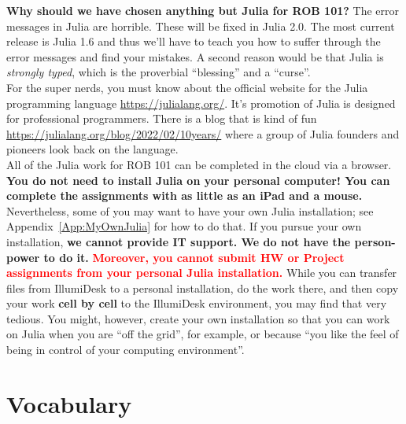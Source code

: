 \textbf{Why should we have chosen anything but Julia for ROB 101?} The error messages in Julia are horrible. These will be fixed in Julia 2.0. The most current release is Julia 1.6 and thus we'll have to teach you how to suffer through the error messages and find your mistakes. A second reason would be that Julia is \emph{strongly typed}, which is the proverbial ``blessing'' and a ``curse''. \\


For the super nerds, you must know about the official website for the Julia programming language \url{https://julialang.org/}. It's promotion of Julia is designed for professional programmers. There is a blog that is kind of fun \url{https://julialang.org/blog/2022/02/10years/} where a group of Julia founders and pioneers look back on the language. \\

All of the Julia work for ROB 101 can be completed in the cloud via a browser. \textbf{You do not need to install Julia on your personal computer! You can complete the assignments with as little as an iPad and a mouse.} Nevertheless, some of you may want to have your own Julia installation; see  Appendix~\ref{App:MyOwnJulia} for how to do that. If you pursue your own installation, \textbf{we cannot provide IT support. We do not have the person-power to do it.} \textcolor{red}{\bf Moreover, you cannot submit HW or Project assignments from your personal Julia installation.} While you can transfer files from IllumiDesk to a  personal installation, do the work there, and then copy your work \textbf{cell by cell} to the IllumiDesk environment, you may find that very tedious. You might, however, create your own installation so that you can work on Julia when you are ``off the grid'', for example, or because ``you like the feel of being in control of your computing environment''. 


\section{Vocabulary}

